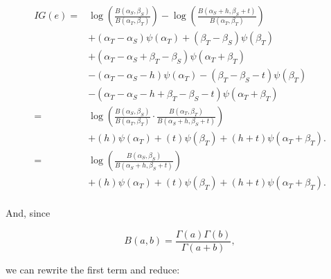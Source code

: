 \documentclass[12pt]{article}
\begin{document}
\begin{equation}
\begin{split}
IG(e)  = & \log( \frac{B(\alpha_{S},\beta_{S})}{B(\alpha_{T},\beta_{T})}) - \log( \frac{B(\alpha_{S}+h,\beta_{S}+t)}{B(\alpha_{T},\beta_{T})}) \\ 
& + (\alpha_T - \alpha_S) \psi (\alpha_T) +  (\beta_T - \beta_S) \psi (\beta_T) \\
& + (\alpha_T - \alpha_S + \beta_T - \beta_S) \psi (\alpha_T + \beta_T)  \\
& - (\alpha_T - \alpha_{S} - h) \psi (\alpha_T) - (\beta_T - \beta_S - t) \psi (\beta_T) \\
& - (\alpha_T - \alpha_{S} - h + \beta_T - \beta_{S} - t) \psi (\alpha_T + \beta_T) \\
= & \log( \frac{B(\alpha_{S},\beta_{S})}{B(\alpha_{T},\beta_{T})} \cdot \frac{B(\alpha_{T},\beta_{T})}{B(\alpha_{S}+h,\beta_{S}+t)}) \\ 
& + (h) \psi (\alpha_T) + (t) \psi (\beta_T) + (h + t) \psi (\alpha_T + \beta_T). \\
= & \log( \frac{B(\alpha_{S},\beta_{S})}{B(\alpha_{S}+h,\beta_{S}+t)}) \\ 
& + (h) \psi (\alpha_T) + (t) \psi (\beta_T) + (h + t) \psi (\alpha_T + \beta_T). \\
\end{split}
\end{equation}

\noindent And, since 

\begin{equation}
B(a,b) = \frac{\Gamma(a)\Gamma(b)}{\Gamma(a+b)},
\end{equation}

\noindent we can rewrite the first term and reduce:
\end{document}
